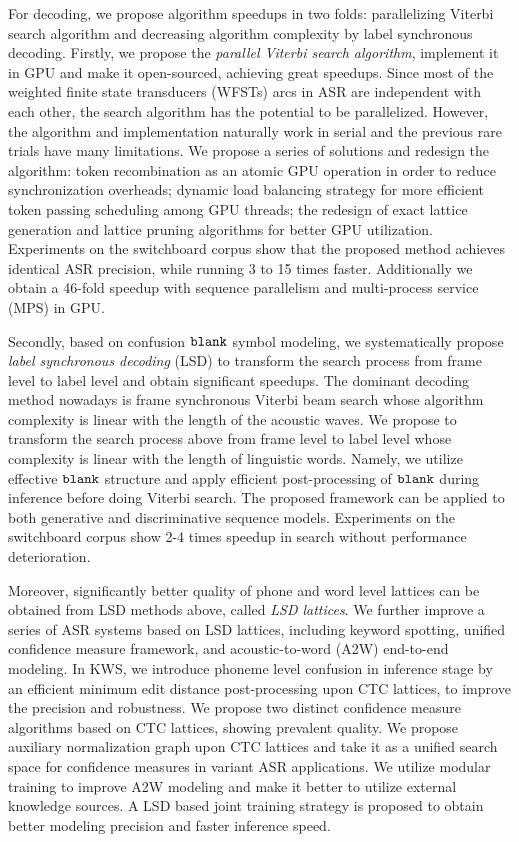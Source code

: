 \begin{englishabstract}
For decoding, we propose algorithm speedups in two folds: parallelizing Viterbi search algorithm and decreasing algorithm complexity by label synchronous decoding. Firstly, we propose the {\em parallel Viterbi search algorithm}, implement it in GPU and make it open-sourced, achieving great speedups. Since most of the weighted finite state transducers (WFSTs) arcs in ASR are independent with each other, the search algorithm has the potential to be parallelized. However, the algorithm and implementation naturally work in serial and the previous rare trials have many limitations. We propose a series of solutions and redesign the algorithm:  token recombination as an atomic GPU operation in order to reduce synchronization overheads; dynamic load balancing strategy for more efficient token passing scheduling among GPU threads; the redesign of exact lattice
generation and lattice pruning algorithms for better GPU utilization. Experiments on the switchboard corpus show that the proposed method achieves identical ASR precision, while running 3 to 15 times faster. Additionally we obtain a 46-fold speedup with sequence parallelism and multi-process service (MPS) in GPU.

Secondly, based on confusion $\tt blank$ symbol modeling, we systematically propose {\em label synchronous decoding} (LSD) to transform the search process from frame level to label level and obtain significant speedups. The dominant decoding method nowadays is frame synchronous Viterbi beam search whose algorithm complexity is linear with the length of the acoustic waves. We propose  to transform the search process above from frame level to label level whose complexity is linear with the length of linguistic words. Namely, we utilize effective $\tt blank$ structure and apply efficient post-processing of $\tt blank$ during inference before doing Viterbi search. The proposed framework can be applied to both generative and discriminative sequence models. Experiments on the switchboard corpus show 2-4 times speedup in search without performance deterioration.

Moreover, significantly better quality of phone and word level lattices can be obtained from LSD methods above, called {\em LSD lattices}. We further improve a series of ASR systems based on LSD lattices, including keyword spotting, unified confidence measure framework, and acoustic-to-word (A2W) end-to-end modeling. In KWS, we introduce phoneme level confusion in inference stage by an efficient minimum edit distance  post-processing upon CTC lattices, to improve the precision and robustness. We propose two distinct confidence measure algorithms based on CTC lattices, showing prevalent quality. We propose auxiliary normalization graph upon CTC lattices  and take it as a unified search space for confidence measures in variant ASR applications. We utilize modular training to improve A2W modeling and make it better to utilize external knowledge sources. A LSD based joint training strategy is proposed to obtain better modeling precision and faster inference speed.


\end{englishabstract}
